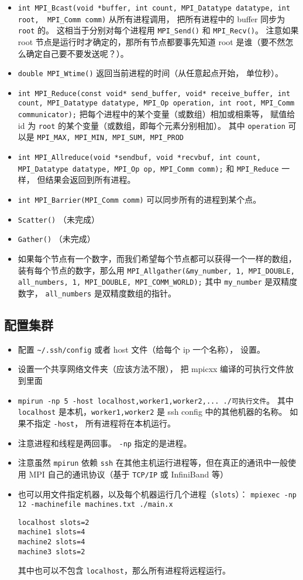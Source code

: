 \begin{itemize}
\item \verb|int MPI_Bcast(void *buffer, int count, MPI_Datatype datatype, int root,  MPI_Comm comm)| 从所有进程调用， 把所有进程中的 buffer 同步为 \verb`root` 的。 这相当于分别对每个进程用 \verb|MPI_Send()| 和 \verb|MPI_Recv()|。 注意如果 root 节点是运行时才确定的，那所有节点都要事先知道 root 是谁（要不然怎么确定自己要不要发送呢？）。
\item \verb|double MPI_Wtime()| 返回当前进程的时间（从任意起点开始， 单位秒）。
\item \verb|int MPI_Reduce(const void* send_buffer, void* receive_buffer, int count, MPI_Datatype datatype, MPI_Op operation, int root, MPI_Comm communicator);| 把每个进程中的某个变量（或数组）相加或相乘等， 赋值给 id 为 \verb|root| 的某个变量（或数组，即每个元素分别相加）。 其中 \verb|operation| 可以是 \verb|MPI_MAX, MPI_MIN, MPI_SUM, MPI_PROD|
\item \verb|int MPI_Allreduce(void *sendbuf, void *recvbuf, int count, MPI_Datatype datatype, MPI_Op op, MPI_Comm comm);| 和 \verb|MPI_Reduce| 一样， 但结果会返回到所有进程。
\item \verb|int MPI_Barrier(MPI_Comm comm)| 可以同步所有的进程到某个点。
\item \verb|Scatter()| （未完成）
\item \verb|Gather()| （未完成）
\item 如果每个节点有一个数字，而我们希望每个节点都可以获得一个一样的数组，装有每个节点的数字，那么用 \verb`MPI_Allgather(&my_number, 1, MPI_DOUBLE, all_numbers, 1, MPI_DOUBLE, MPI_COMM_WORLD);` 其中 \verb`my_number` 是双精度数字， \verb`all_numbers` 是双精度数组的指针。
\end{itemize}

\subsection{配置集群}
\begin{itemize}
\item 配置 \verb`~/.ssh/config` 或者 host 文件（给每个 ip 一个名称）， 设置。
\item 设置一个共享网络文件夹（应该方法不限）， 把 mpicxx 编译的可执行文件放到里面
\item \verb|mpirun -np 5 -host localhost,worker1,worker2,... ./可执行文件|。 其中 \verb`localhost` 是本机，\verb`worker1,worker2` 是 ssh config 中的其他机器的名称。 如果不指定 \verb`-host`， 所有进程将在本机运行。
\item 注意进程和线程是两回事。 \verb`-np` 指定的是进程。
\item 注意虽然 \verb`mpirun` 依赖 \verb`ssh` 在其他主机运行进程等，但在真正的通讯中一般使用 MPI 自己的通讯协议（基于 \verb`TCP/IP` 或 InfiniBand 等）
\item 也可以用文件指定机器，以及每个机器运行几个进程（\verb`slots`）： \verb`mpiexec -np 12 -machinefile machines.txt ./main.x`
\begin{lstlisting}[language=none,caption=machines.txt]
localhost slots=2
machine1 slots=4
machine2 slots=4
machine3 slots=2
\end{lstlisting}
其中也可以不包含 \verb`localhost`，那么所有进程将远程运行。
\end{itemize}
